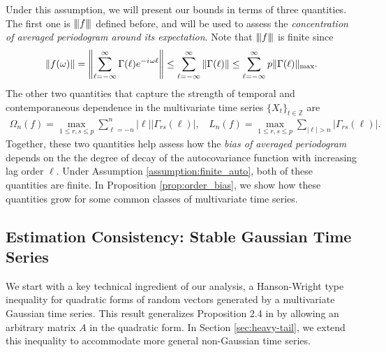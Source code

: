 \noindent Under this assumption, we will present our bounds in terms of three quantities. The first one is ${\left\vert\kern-0.25ex\left\vert\kern-0.25ex\left\vert f \right\vert\kern-0.25ex\right\vert\kern-0.25ex\right\vert}$ defined before, and will be used to assess the \textit{concentration of averaged periodogram around its expectation}. Note that ${\left\vert\kern-0.25ex\left\vert\kern-0.25ex\left\vert f \right\vert\kern-0.25ex\right\vert\kern-0.25ex\right\vert}$ is finite since  
\begin{equation}
\|f(\omega)\| = \left\|\sum_{\ell = -\infty}^\infty \Gamma(\ell) e^{-{i\mkern1mu} \omega \ell }\right\| \le \sum_{\ell = -\infty}^\infty \|\Gamma(\ell)\| \le \sum_{\ell=-\infty}^\infty p\|\Gamma(\ell)\|_{\rm{max}}.
\end{equation}
The other two quantities that capture the strength of temporal and contemporaneous dependence in the multivariate time series $\{X_t\}_{t \in \mathbb{Z}}$ are 
\begin{eqnarray}
\Omega_{n}(f) = \max_{1 \le r,s \le p} \sum_{\ell=-n}^n |\ell| |\Gamma_{rs}(\ell)|, ~~~~ L_n(f) = \max_{1 \le r,s \le p}\sum_{|\ell|>n} |\Gamma_{rs}(\ell)|.
\end{eqnarray}
Together, these two quantities help assess  how the \textit{bias of averaged periodogram} depends on the the degree of decay of the autocovariance function with increasing lag order $\ell$. Under Assumption \ref{assumption:finite_auto}, both of these quantities are finite. In Proposition \ref{prop:order_bias}, we show how these quantities grow for some common classes of multivariate time series.

\subsection{Estimation Consistency: Stable Gaussian Time Series} 

We start with a key technical ingredient of our analysis, a  Hanson-Wright type inequality \citep{rudelson2013hanson} for quadratic forms of random vectors generated by a multivariate Gaussian time series. This result generalizes Proposition 2.4 in \cite{Basu2015} by allowing an arbitrary matrix $A$ in the quadratic form. In Section \ref{sec:heavy-tail}, we extend this inequality to accommodate more general non-Gaussian time series.

